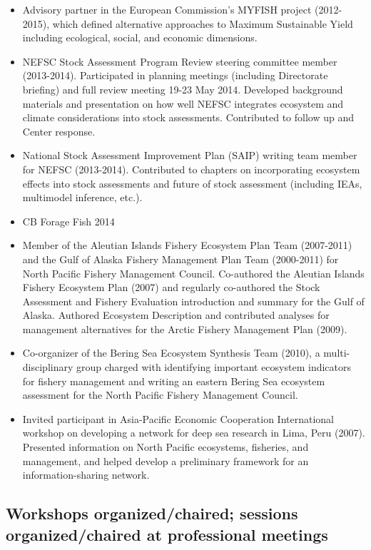 \documentclass[11pt, a4paper]{awesome-cv}
\begin{document}
\begin{itemize}
\item
  Advisory partner in the European Commission's MYFISH project
  (2012-2015), which defined alternative approaches to Maximum
  Sustainable Yield including ecological, social, and economic
  dimensions.
\item
  NEFSC Stock Assessment Program Review steering committee member
  (2013-2014). Participated in planning meetings (including Directorate
  briefing) and full review meeting 19-23 May 2014. Developed background
  materials and presentation on how well NEFSC integrates ecosystem and
  climate considerations into stock assessments. Contributed to follow
  up and Center response.
\item
  National Stock Assessment Improvement Plan (SAIP) writing team member
  for NEFSC (2013-2014). Contributed to chapters on incorporating
  ecosystem effects into stock assessments and future of stock
  assessment (including IEAs, multimodel inference, etc.).\\
\item
  CB Forage Fish 2014
\item
  Member of the Aleutian Islands Fishery Ecosystem Plan Team (2007-2011)
  and the Gulf of Alaska Fishery Management Plan Team (2000-2011) for
  North Pacific Fishery Management Council. Co-authored the Aleutian
  Islands Fishery Ecosystem Plan (2007) and regularly co-authored the
  Stock Assessment and Fishery Evaluation introduction and summary for
  the Gulf of Alaska. Authored Ecosystem Description and contributed
  analyses for management alternatives for the Arctic Fishery Management
  Plan (2009).
\item
  Co-organizer of the Bering Sea Ecosystem Synthesis Team (2010), a
  multi-disciplinary group charged with identifying important ecosystem
  indicators for fishery management and writing an eastern Bering Sea
  ecosystem assessment for the North Pacific Fishery Management Council.
\item
  Invited participant in Asia-Pacific Economic Cooperation International
  workshop on developing a network for deep sea research in Lima, Peru
  (2007). Presented information on North Pacific ecosystems, fisheries,
  and management, and helped develop a preliminary framework for an
  information-sharing network.
\end{itemize}

\hypertarget{workshops-organizedchaired-sessions-organizedchaired-at-professional-meetings}{%
\subsection{Workshops organized/chaired; sessions organized/chaired at
professional
meetings}\label{workshops-organizedchaired-sessions-organizedchaired-at-professional-meetings}}
\end{document}
